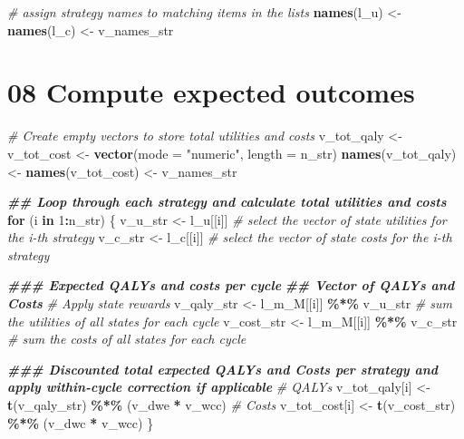 \documentclass[
]{article}
\newenvironment{Shaded}{\begin{snugshade}}{\end{snugshade}}
\newcommand{\AttributeTok}[1]{\textcolor[rgb]{0.13,0.29,0.53}{#1}}
\newcommand{\CommentTok}[1]{\textcolor[rgb]{0.56,0.35,0.01}{\textit{#1}}}
\newcommand{\ControlFlowTok}[1]{\textcolor[rgb]{0.13,0.29,0.53}{\textbf{#1}}}
\newcommand{\DecValTok}[1]{\textcolor[rgb]{0.00,0.00,0.81}{#1}}
\newcommand{\DocumentationTok}[1]{\textcolor[rgb]{0.56,0.35,0.01}{\textbf{\textit{#1}}}}
\newcommand{\FunctionTok}[1]{\textcolor[rgb]{0.13,0.29,0.53}{\textbf{#1}}}
\newcommand{\NormalTok}[1]{#1}
\newcommand{\OtherTok}[1]{\textcolor[rgb]{0.56,0.35,0.01}{#1}}
\newcommand{\SpecialCharTok}[1]{\textcolor[rgb]{0.81,0.36,0.00}{\textbf{#1}}}
\newcommand{\StringTok}[1]{\textcolor[rgb]{0.31,0.60,0.02}{#1}}
\begin{document}
\begin{Shaded}
\begin{Highlighting}[]
\CommentTok{\# assign strategy names to matching items in the lists}
\FunctionTok{names}\NormalTok{(l\_u) }\OtherTok{\textless{}{-}} \FunctionTok{names}\NormalTok{(l\_c) }\OtherTok{\textless{}{-}}\NormalTok{ v\_names\_str}
\end{Highlighting}
\end{Shaded}

\hypertarget{compute-expected-outcomes}{%
\section{08 Compute expected outcomes}\label{compute-expected-outcomes}}

\begin{Shaded}
\begin{Highlighting}[]
\CommentTok{\# Create empty vectors to store total utilities and costs }
\NormalTok{v\_tot\_qaly }\OtherTok{\textless{}{-}}\NormalTok{ v\_tot\_cost }\OtherTok{\textless{}{-}} \FunctionTok{vector}\NormalTok{(}\AttributeTok{mode =} \StringTok{"numeric"}\NormalTok{, }\AttributeTok{length =}\NormalTok{ n\_str)}
\FunctionTok{names}\NormalTok{(v\_tot\_qaly) }\OtherTok{\textless{}{-}} \FunctionTok{names}\NormalTok{(v\_tot\_cost) }\OtherTok{\textless{}{-}}\NormalTok{ v\_names\_str}

\DocumentationTok{\#\# Loop through each strategy and calculate total utilities and costs }
\ControlFlowTok{for}\NormalTok{ (i }\ControlFlowTok{in} \DecValTok{1}\SpecialCharTok{:}\NormalTok{n\_str) \{}
\NormalTok{  v\_u\_str }\OtherTok{\textless{}{-}}\NormalTok{ l\_u[[i]]   }\CommentTok{\# select the vector of state utilities for the i{-}th strategy}
\NormalTok{  v\_c\_str }\OtherTok{\textless{}{-}}\NormalTok{ l\_c[[i]]   }\CommentTok{\# select the vector of state costs for the i{-}th strategy}
  
  \DocumentationTok{\#\#\# Expected QALYs and costs per cycle }
  \DocumentationTok{\#\# Vector of QALYs and Costs}
  \CommentTok{\# Apply state rewards }
\NormalTok{  v\_qaly\_str }\OtherTok{\textless{}{-}}\NormalTok{ l\_m\_M[[i]] }\SpecialCharTok{\%*\%}\NormalTok{ v\_u\_str }\CommentTok{\# sum the utilities of all states for each cycle}
\NormalTok{  v\_cost\_str }\OtherTok{\textless{}{-}}\NormalTok{ l\_m\_M[[i]] }\SpecialCharTok{\%*\%}\NormalTok{ v\_c\_str }\CommentTok{\# sum the costs of all states for each cycle}
  
  \DocumentationTok{\#\#\# Discounted total expected QALYs and Costs per strategy and apply within{-}cycle correction if applicable}
  \CommentTok{\# QALYs}
\NormalTok{  v\_tot\_qaly[i] }\OtherTok{\textless{}{-}} \FunctionTok{t}\NormalTok{(v\_qaly\_str) }\SpecialCharTok{\%*\%}\NormalTok{ (v\_dwe }\SpecialCharTok{*}\NormalTok{ v\_wcc)}
  \CommentTok{\# Costs}
\NormalTok{  v\_tot\_cost[i] }\OtherTok{\textless{}{-}} \FunctionTok{t}\NormalTok{(v\_cost\_str) }\SpecialCharTok{\%*\%}\NormalTok{ (v\_dwc }\SpecialCharTok{*}\NormalTok{ v\_wcc)}
\NormalTok{\}}
\end{Highlighting}
\end{Shaded}
\end{document}
